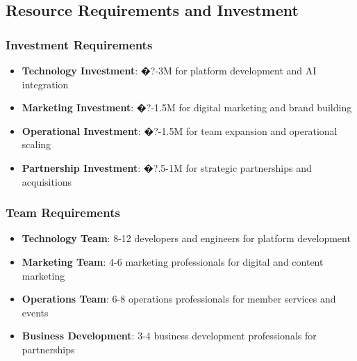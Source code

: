 \subsection{Resource Requirements and Investment}

\subsubsection{Investment Requirements}
\begin{itemize}
    \item \textbf{Technology Investment}: �?-3M for platform development and AI integration
    \item \textbf{Marketing Investment}: �?-1.5M for digital marketing and brand building
    \item \textbf{Operational Investment}: �?-1.5M for team expansion and operational scaling
    \item \textbf{Partnership Investment}: �?.5-1M for strategic partnerships and acquisitions
\end{itemize}

\subsubsection{Team Requirements}
\begin{itemize}
    \item \textbf{Technology Team}: 8-12 developers and engineers for platform development
    \item \textbf{Marketing Team}: 4-6 marketing professionals for digital and content marketing
    \item \textbf{Operations Team}: 6-8 operations professionals for member services and events
    \item \textbf{Business Development}: 3-4 business development professionals for partnerships
\end{itemize}

